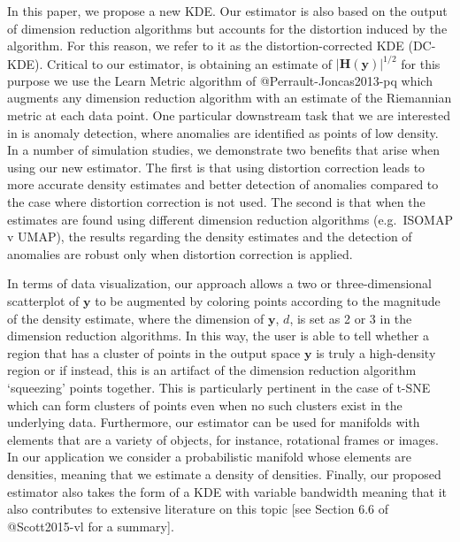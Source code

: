\documentclass[
]{article}
\begin{document}
In this paper, we propose a new KDE. Our estimator is also based on the
output of dimension reduction algorithms but accounts for the distortion
induced by the algorithm. For this reason, we refer to it as the
distortion-corrected KDE (DC-KDE). Critical to our estimator, is
obtaining an estimate of \(|\bm{H}(\bm{y})|^{1/2}\) for this purpose we
use the Learn Metric algorithm of @Perrault-Joncas2013-pq which augments
any dimension reduction algorithm with an estimate of the Riemannian
metric at each data point. One particular downstream task that we are
interested in is anomaly detection, where anomalies are identified as
points of low density. In a number of simulation studies, we demonstrate
two benefits that arise when using our new estimator. The first is that
using distortion correction leads to more accurate density estimates and
better detection of anomalies compared to the case where distortion
correction is not used. The second is that when the estimates are found
using different dimension reduction algorithms (e.g.~ISOMAP v UMAP), the
results regarding the density estimates and the detection of anomalies
are robust only when distortion correction is applied.

In terms of data visualization, our approach allows a two or
three-dimensional scatterplot of \(\bm{y}\) to be augmented by coloring
points according to the magnitude of the density estimate, where the
dimension of \(\bm{y}\), \(d\), is set as 2 or 3 in the dimension
reduction algorithms. In this way, the user is able to tell whether a
region that has a cluster of points in the output space \(\bm{y}\) is
truly a high-density region or if instead, this is an artifact of the
dimension reduction algorithm `squeezing' points together. This is
particularly pertinent in the case of t-SNE which can form clusters of
points even when no such clusters exist in the underlying data.
Furthermore, our estimator can be used for manifolds with elements that
are a variety of objects, for instance, rotational frames or images. In
our application we consider a probabilistic manifold whose elements are
densities, meaning that we estimate a density of densities. Finally, our
proposed estimator also takes the form of a KDE with variable bandwidth
meaning that it also contributes to extensive literature on this topic
{[}see Section 6.6 of @Scott2015-vl for a summary{]}.
\end{document}
